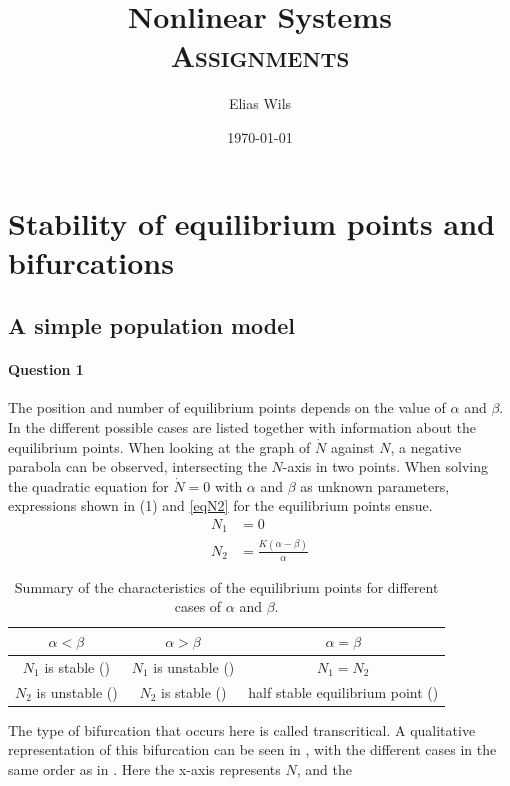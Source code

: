 \documentclass[a4paper,11pt]{article}
\title{Nonlinear Systems \\[1ex]
    \Large \textsc{Assignments}}
\author{Elias Wils}
\date{\today}
\begin{document}
\maketitle
\newpage
\tableofcontents

\newpage
\section{Stability of equilibrium points and bifurcations}    
\subsection{A simple population model}
\paragraph{Question 1}\: The position and number of equilibrium points depends on the value of $\alpha$ and $\beta$.
In  the different possible cases are listed together with information about the equilibrium points.
When looking at the graph of $\dot{N}$ against $N$, a negative parabola can be observed, intersecting the $N$-axis in two points.
When solving the quadratic equation for $\dot{N}=0$ with $\alpha$ and $\beta$ as unknown parameters, expressions shown in (1) and \eqref{eqN2} for
the equilibrium points ensue.
\begin{align}
	N_1 &= 0\\
	N_2 &= \frac{K(\alpha-\beta)}{\alpha}
	\label{eqN2}
\end{align}
\begin{table}[H]
	\centering
	\begin{tabular}{|c|c|c|}
	\hline
	$\alpha<\beta$ & $\alpha>\beta$ & $\alpha=\beta$\\
	\hline
	$N_1$ is stable (\CIRCLE) & $N_1$ is unstable (\Circle) & $N_1=N_2$\\
	$N_2$ is unstable (\Circle) & $N_2$ is stable (\CIRCLE) & half stable equilibrium point (\RIGHTcircle)\\
	\hline
	\end{tabular}
	\captionsetup{width=0.9\textwidth}
	\caption{Summary of the characteristics of the equilibrium points for different cases of $\alpha$ and $\beta$. }
	\label{tbeq1}
\end{table}
The type of bifurcation that occurs here is called transcritical. A qualitative representation of this bifurcation can be seen in 
, with the different cases in the same order as in . Here the x-axis represents $N$, and the 
\end{document}
